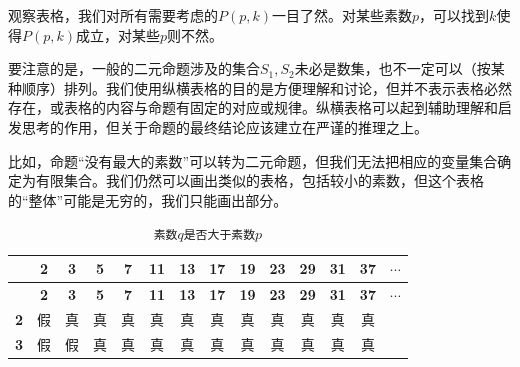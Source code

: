 \documentclass[12pt,UTF8,fontset=none]{ctexbook}
\begin{document}
观察表格，我们对所有需要考虑的$P(p,k)$一目了然。对某些素数$p$，可以找到$k$使得$P(p,k)$成立，对某些$p$则不然。

要注意的是，一般的二元命题涉及的集合$S_1,S_2$未必是数集，也不一定可以（按某种顺序）排列。我们使用纵横表格的目的是方便理解和讨论，但并不表示表格必然存在，或表格的内容与命题有固定的对应或规律。纵横表格可以起到辅助理解和启发思考的作用，但关于命题的最终结论应该建立在严谨的推理之上。

比如，命题“没有最大的素数”可以转为二元命题，但我们无法把相应的变量集合确定为有限集合。我们仍然可以画出类似的表格，包括较小的素数，但这个表格的“整体”可能是无穷的，我们只能画出部分。

\setlength{\colwidth}{\dimexpr(0.6\textwidth-2\tabcolsep*13)/13\relax}
{
\setlength{\abovecaptionskip}{-24pt}
\setlength{\belowcaptionskip}{12pt}
\renewcommand{\arraystretch}{0.8}
\footnotesize
\begin{longtable}{|>{\centering\arraybackslash}p{0.7cm}|*{12}{C|}C}
\hline
 & \textbf{2} & \textbf{3} & \textbf{5} & \textbf{7} & \textbf{11} & \textbf{13} & \textbf{17} & \textbf{19} & \textbf{23} & \textbf{29} & \textbf{31} & \textbf{37} & $\cdots$ \\ \hline
\endfirsthead
\hline
{} & \textbf{2} & \textbf{3} & \textbf{5} & \textbf{7} & \textbf{11} & \textbf{13} & \textbf{17} & \textbf{19} & \textbf{23} & \textbf{29} & \textbf{31} & \textbf{37} & $\cdots$ \\ \hline
\endhead
\endfoot
\caption*{\texttt{素数$q$是否大于素数$p$}}\label{tab:4-2}
\endlastfoot
\textbf{2} & 假 & 真 & 真 & 真 & 真 & 真 & 真 & 真 & 真 & 真 & 真 & 真 & \\ \hline
\textbf{3} & 假 & 假 & 真 & 真 & 真 & 真 & 真 & 真 & 真 & 真 & 真 & 真 & \\ \hline

\end{longtable}}
\end{document}
